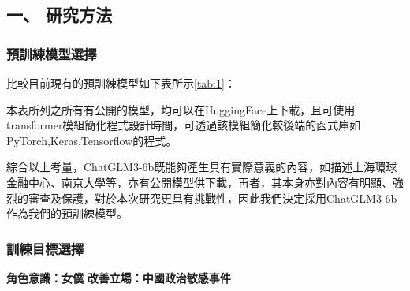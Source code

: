 \documentclass[12pt,a4paper,Times New Roman,UTF8,natbib]{article}
\begin{document}
\begin{CJK*}{UTF8}{bsmi}
	\subsection{一、 研究方法}
	\subsubsection{預訓練模型選擇}
	比較目前現有的預訓練模型如下表所示\ref{tab:1}：
	\begin{table}[H]
	\caption{表一、比較及評估預訓練模型}
	\label{tab:1}
	\end{table}
	本表所列之所有有公開的模型，均可以在HuggingFace上下載，且可使用transformer模組簡化程式設計時間，可透過該模組簡化較後端的函式庫如PyTorch,Keras,Tensorflow的程式。
	
	綜合以上考量，ChatGLM3-6b既能夠產生具有實際意義的內容，如描述上海環球金融中心、南京大學等，亦有公開模型供下載，再者，其本身亦對內容有明顯、強烈的審查及保護，對於本次研究更具有挑戰性，因此我們決定採用ChatGLM3-6b作為我們的預訓練模型。
	
	\subsubsection{訓練目標選擇}
	\textbf{角色意識：女僕}
	\textbf{改善立場：中國政治敏感事件}
	

\end{CJK*}
\end{document}
